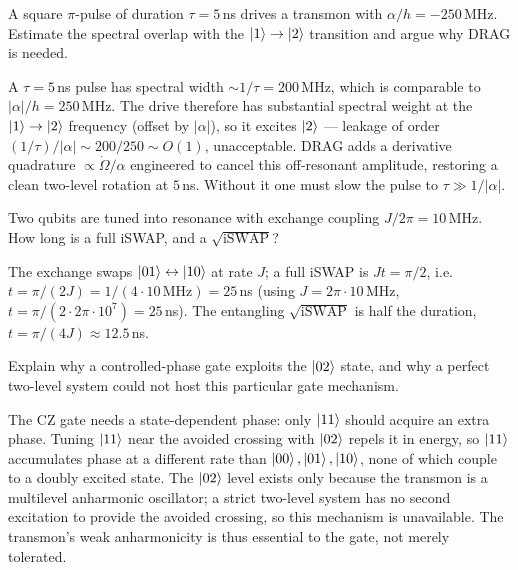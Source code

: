 \begin{exercise}
A square $\pi$-pulse of duration $\tau=5\,$ns drives a transmon with
$\alpha/h=-250\,$MHz. Estimate the spectral overlap with the
$\ket1\to\ket2$ transition and argue why DRAG is needed.
\begin{solution}
A $\tau=5\,$ns pulse has spectral width $\sim1/\tau=200\,$MHz, which is
comparable to $|\alpha|/h=250\,$MHz. The drive therefore has
substantial spectral weight at the $\ket1\to\ket2$ frequency (offset by
$|\alpha|$), so it excites $\ket2$ --- leakage of order
$(1/\tau)/|\alpha|\sim200/250\sim O(1)$, unacceptable. DRAG adds a
derivative quadrature $\propto\dot\Omega/\alpha$ engineered to cancel
this off-resonant amplitude, restoring a clean two-level rotation at
$5\,$ns. Without it one must slow the pulse to $\tau\gg1/|\alpha|$.
\end{solution}
\end{exercise}

\begin{exercise}
Two qubits are tuned into resonance with exchange coupling
$J/2\pi=10\,$MHz. How long is a full iSWAP, and a $\sqrt{\text{iSWAP}}$?
\begin{solution}
The exchange swaps $\ket{01}\leftrightarrow\ket{10}$ at rate $J$; a full
iSWAP is $Jt=\pi/2$, i.e.\ $t=\pi/(2J)=1/(4\cdot10\,\text{MHz})=25\,$ns
(using $J=2\pi\cdot10\,$MHz, $t=\pi/(2\cdot2\pi\cdot10^7)=25\,$ns). The
entangling $\sqrt{\text{iSWAP}}$ is half the duration, $t=\pi/(4J)\approx12.5\,$ns.
\end{solution}
\end{exercise}

\begin{exercise}
Explain why a controlled-phase gate exploits the $\ket{02}$ state, and
why a perfect two-level system could not host this particular gate
mechanism.
\begin{solution}
The CZ gate needs a state-dependent phase: only $\ket{11}$ should
acquire an extra phase. Tuning $\ket{11}$ near the avoided crossing with
$\ket{02}$ repels it in energy, so $\ket{11}$ accumulates phase at a
different rate than $\ket{00},\ket{01},\ket{10}$, none of which couple
to a doubly excited state. The $\ket{02}$ level exists only because the
transmon is a multilevel anharmonic oscillator; a strict two-level
system has no second excitation to provide the avoided crossing, so
this mechanism is unavailable. The transmon's weak anharmonicity is
thus essential to the gate, not merely tolerated.
\end{solution}
\end{exercise}

